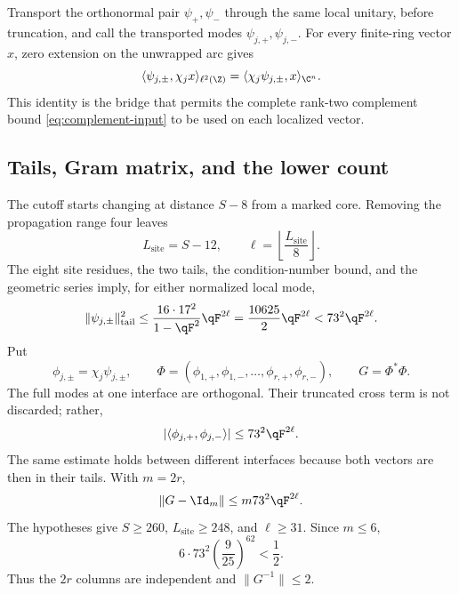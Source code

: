 Transport the orthonormal pair \(\psi_+,\psi_-\) through the same local
unitary, before truncation, and call the transported modes
\(\psi_{j,+},\psi_{j,-}\).  For every finite-ring vector \(x\), zero
extension on the unwrapped arc gives
\begin{equation}
 \langle\psi_{j,\pm},\chi_jx\rangle_{\ell^2(\Z)}
 =\langle\chi_j\psi_{j,\pm},x\rangle_{\C^n}.
 \label{eq:complement-identity}
\end{equation}
This identity is the bridge that permits the complete rank-two complement
bound \eqref{eq:complement-input} to be used on each localized vector.

\subsection{Tails, Gram matrix, and the lower count}

The cutoff starts changing at distance \(S-8\) from a marked core.  Removing
the propagation range four leaves
\begin{equation}
 L_{\mathrm{site}}=S-12,\qquad
 \ell=\left\lfloor\frac{L_{\mathrm{site}}}{8}\right\rfloor.
 \label{eq:ell}
\end{equation}
The eight site residues, the two tails, the condition-number bound, and the
geometric series imply, for either normalized local mode,
\begin{equation}
 \|\psi_{j,\pm}\|_{\mathrm{tail}}^2
 \leq\frac{16\cdot17^2}{1-\qF^2}\qF^{2\ell}
 =\frac{10625}{2}\qF^{2\ell}<73^2\qF^{2\ell}.
 \label{eq:tail}
\end{equation}
Put
\begin{equation}
 \phi_{j,\pm}=\chi_j\psi_{j,\pm},
 \qquad
 \Phi=(\phi_{1,+},\phi_{1,-},\ldots,\phi_{r,+},\phi_{r,-}),
 \qquad G=\Phi^*\Phi.
 \label{eq:phi}
\end{equation}
The full modes at one interface are orthogonal.  Their truncated cross term
is not discarded; rather,
\[
 |\langle\phi_{j,+},\phi_{j,-}\rangle|
 \leq73^2\qF^{2\ell}.
\]
The same estimate holds between different interfaces because both vectors
are then in their tails.  With \(m=2r\),
\begin{equation}
 \|G-\Id_m\|\leq m73^2\qF^{2\ell}.
 \label{eq:gram}
\end{equation}
The hypotheses give \(S\geq260\), \(L_{\mathrm{site}}\geq248\), and
\(\ell\geq31\).  Since \(m\leq6\),
\begin{equation}
 6\cdot73^2\left(\frac9{25}\right)^{62}<\frac12.
 \label{eq:gram-numeric}
\end{equation}
Thus the \(2r\) columns are independent and \(\|G^{-1}\|\leq2\).

